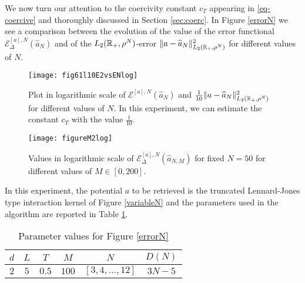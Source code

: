 We now turn our attention to the coercivity constant $c_T$ appearing in \eqref{eq-coercive} and thoroughly discussed in Section \ref{sec:coerc}. In Figure \ref{errorN} we see a comparison between the evolution of the value of the error functional $\mathcal{E}^{[a],N}_\Delta(\widehat{a}_N)$ and of the $L_2(\mathbb{R}_+,\rho^N)$-error $\|a-\widehat{a}_N\|^2_{L_2(\mathbb{R}_+,\rho^N)}$ for different values of $N$. 

\begin{figure}[h]
\hspace{-1.2cm}
\begin{minipage}{0.58\textwidth}
\begin{center}
\texttt{[image: fig61l10E2vsENlog]}
\end{center}
\label{fig:coerc}
\caption{Plot in logarithmic scale of $\mathcal{E}^{[a],N}(\widehat{a}_N)$ and $\frac{1}{10}\|a-\widehat{a}_N\|^2_{L_2(\mathbb{R}_+,\rho^N)}$ for different values of $N$. In this experiment, we can estimate the constant $c_T$ with the value $\frac{1}{10}$.}\label{errorN}
\end{minipage}
\hspace{0.4cm}
\begin{minipage}{0.55\textwidth}
\begin{center}
\texttt{[image: figureM2log]}
\end{center}
\label{fig:coerc2}
\caption{Values in logarithmic scale of $\mathcal{E}^{[a],N}_\Delta(\widehat a_{N,M})$ for fixed $N = 50$ for different values of $M \in [0,200]$.}\label{Mconstr}
\end{minipage}
\end{figure}

In this experiment, the potential $a$ to be retrieved is the truncated Lennard-Jones type interaction kernel of Figure \ref{variableN} and the parameters used in the algorithm are reported in Table \ref{tab:fig3}.

\begin{table}[h]
\begin{center}
\begin{tabular}{ |c|c|c|c|c|c| }
\hline
  $d$ & $L$ & $T$ & $M$ & $N$ & $D(N)$ \\
\hline
\hline
  $2$ & $5$ & $0.5$ & $100$ & $[3,4,\ldots,12]$ & $3N-5$ \\
\hline
\end{tabular}
\end{center}
\vspace{-0.5cm}
\caption{Parameter values for Figure \ref{errorN} } \label{tab:fig3} 
\end{table}

